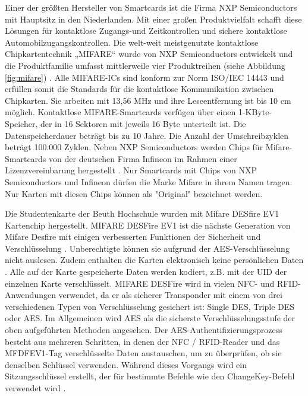 Einer der größten Hersteller von Smartcards ist die Firma NXP Semiconductors mit Hauptsitz in den Niederlanden. Mit einer großen Produktvielfalt schafft diese Lösungen für kontaktlose Zugangs-und Zeitkontrollen und sichere kontaktlose Automobilzugangskontrollen. Die welt-weit meistgenutzte kontaktlose Chipkartentechnik „MIFARE“ wurde von NXP Semiconductors entwickelt und die Produktfamilie umfasst mittlerweile vier Produktreihen (siehe Abbildung \ref{fig:mifare}) \cite{website:9}. Alle MIFARE-ICs sind konform zur Norm ISO/IEC 14443 und erfüllen somit die Standards für die kontaktlose Kommunikation zwischen Chipkarten. Sie arbeiten mit 13,56 MHz und ihre Leseentfernung ist bis 10 cm möglich. Kontaktlose MIFARE-Smartcards verfügen über einen 1-KByte-Speicher, der in 16 Sektoren mit jeweils 16 Byte unterteilt ist. Die Datenspeicherdauer beträgt bis zu 10 Jahre. Die Anzahl der Umschreibzyklen beträgt 100.000 Zyklen. Neben NXP Semiconductors werden Chips für Mifare-Smartcards von der deutschen Firma Infineon im Rahmen einer Lizenzvereinbarung hergestellt \cite{website:11}. Nur Smartcards mit Chips von NXP Semiconductors und Infineon dürfen die Marke Mifare in ihrem Namen tragen. Nur Karten mit diesen Chips können als "Original" bezeichnet werden.

Die Studentenkarte der Beuth Hochschule wurden mit Mifare DESfire EV1 Kartenchip hergestellt. MIFARE DESFire EV1 ist die nächste Generation von Mifare Desfire mit einigen verbesserten Funktionen der Sicherheit und Verschlüsselung \cite[p.83]{chirico:smart_card}. Unberechtigte können sie aufgrund der AES-Verschlüsselung nicht auslesen. Zudem enthalten die Karten elektronisch keine persönlichen Daten \cite{website:12}. Alle auf der Karte gespeicherte Daten werden kodiert, z.B. mit der UID der einzelnen Karte verschlüsselt. MIFARE DESFire wird in vielen NFC- und RFID-Anwendungen verwendet, da er als sicherer Transponder mit einem von drei verschiedenen Typen von Verschlüsselung gesichert ist: Single DES, Triple DES oder AES. Im Allgemeinen wird AES als die sicherste Verschlüsselungsstufe der oben aufgeführten Methoden angesehen. Der AES-Authentifizierungsprozess besteht aus mehreren Schritten, in denen der NFC / RFID-Reader und das MFDFEV1-Tag verschlüsselte Daten austauschen, um zu überprüfen, ob sie denselben Schlüssel verwenden. Während dieses Vorgangs wird ein Sitzungsschlüssel erstellt, der für bestimmte Befehle wie den ChangeKey-Befehl verwendet wird \cite{website:10}.


